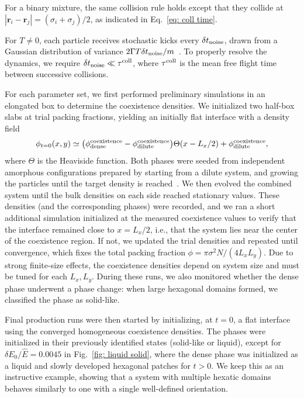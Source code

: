 \documentclass[aps,
reprint,
superscriptaddress,









amsmath,amssymb,floatfix,






prl
]{revtex4-2}
\begin{document}
For a binary mixture, the same collision rule holds except that they collide at $|\bm r_i - \bm r_j|=(\sigma_{i}+\sigma_j)/2$, as indicated in Eq.~\eqref{eq: coll time}.

For $T \neq 0$, each particle receives stochastic kicks every $\delta t_{\rm noise}$, drawn from a Gaussian distribution of variance $2\Gamma T \delta t_{\rm noise}/m$~\cite{ma2017fluctuation}. To properly resolve the dynamics, we require $\delta t_{\rm noise} \ll \tau^{\rm coll}$, where $\tau^{\rm coll}$ is the mean free flight time between successive collisions.


For each parameter set, we first performed preliminary simulations in an elongated box to determine the coexistence densities. We initialized two half-box slabs at trial packing fractions, yielding an initially flat interface with a density field
\begin{equation}
    \phi_{t=0}(x,y)\simeq \big(\phi_{\rm dense}^{\rm coexistence}-\phi_{\rm dilute}^{\rm coexistence}\big)\Theta(x-L_x/2)+\phi_{\rm dilute}^{\rm coexistence},
\end{equation}
where $\Theta$ is the Heaviside function. Both phases were seeded from independent amorphous configurations prepared by starting from a dilute system, and growing the particles until the target density is reached~\cite{smallenburg2022efficient}. We then evolved the combined system until the bulk densities on each side reached stationary values. These densities (and the corresponding phases) were recorded, and we ran a short additional simulation initialized at the measured coexistence values to verify that the interface remained close to $x=L_x/2$, i.e., that the system lies near the center of the coexistence region. If not, we updated the trial densities and repeated until convergence, which fixes the total packing fraction $\phi=\pi\sigma^2N/(4L_xL_y)$. Due to strong finite-size effects, the coexistence densities depend on system size and must be tuned for each $L_x, L_y$. During these runs, we also monitored whether the dense phase underwent a phase change: when large hexagonal domains formed, we classified the phase as solid-like.


Final production runs were then started by initializing, at $t=0$, a flat interface using the converged homogeneous coexistence densities. The phases were initialized in their previously identified states (solid-like or liquid), except for $\delta E_0/\hat E=0.0045$ in Fig.~\ref{fig: liquid solid}, where the dense phase was initialized as a liquid and slowly developed hexagonal patches for $t>0$. We keep this as an instructive example, showing that a system with multiple hexatic domains behaves similarly to one with a single well-defined orientation.
\end{document}
